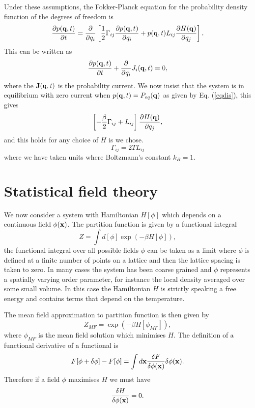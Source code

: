 Under these assumptions, the Fokker-Planck equation for the probability density function of the degrees of freedom is 
\begin{equation}
    \frac{\partial p({\bf q},t)}{\partial t} = \frac{\partial}{\partial q_i} \left[\frac{1}{2}\Gamma_{ij}     \frac{\partial p({\bf q},t)}{\partial q_i} + p({\bf q},t) L_{ij}\frac{\partial H({\bf q})}{ \partial q_j}\right].
\end{equation}
This can be written as 
\begin{equation}
    \frac{\partial p({\bf q},t)}{\partial t} +\frac{\partial}{\partial q_i}J_i({\bf q},t)=0,
\end{equation}
where the ${\bf J}({\bf q},t)$ is the probability current. We now insist that the system is in equilibrium with zero current when $p({\bf q},t)= P_{eq}({\bf q})$ as given by Eq. (\ref{eqdis}), this gives
\begin{equation}
    \left[-\frac{\beta}{2}\Gamma_{ij} + L_{ij}\right]\frac{\partial H({\bf q})}{ \partial q_j},
\end{equation}
and this holds for any choice of $H$ is we chose.
\begin{equation}
    \Gamma_{ij}= 2T L_{ij}
\end{equation}
where we have taken units where Boltzmann's constant $k_B=1$. 

    \section{Statistical field theory}

We now consider a system with Hamiltonian $H[\phi]$ which depends on a continuous field 
$\phi({\bf x})$. The partition function is given by a functional integral
\begin{equation}
    Z = \int d[\phi] \exp(-\beta H[\phi]),
\end{equation}
the functional integral over all possible fields $\phi$ can be taken as a limit where $\phi$ is defined at a finite number of points on a lattice and then the lattice spacing is taken to zero. 
In many cases  the system has been coarse grained and $\phi$ represents a spatially varying order parameter, for instance the local density averaged over some small volume. In this case the Hamiltonian $H$ is strictly speaking a free energy  and contains terms that depend on the temperature.

The mean field approximation to partition function is then given by
\begin{equation}
    Z _{MF}=  \exp(-\beta H[\phi_{MF}]),
\end{equation} 
where $\phi_{MF}$ is the mean field solution which minimises $H$. The definition of a functional derivative of a functional is
\begin{equation}
    F[\phi+\delta\phi]-F[\phi]= \int d{\bf x} \frac{\delta F}{\delta\phi({\bf x})} \delta\phi({\bf x}).
\end{equation}
Therefore if a field $\phi$ maximises $H$ we must have 
\begin{equation}
    \frac{\delta H}{\delta\phi({\bf x})}=0.
\end{equation}

